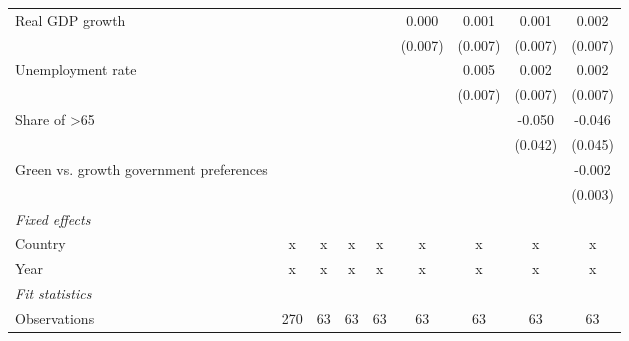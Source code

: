 \begin{table}[htbp]
\begin{tabular}{lcccccccc}
      Real GDP growth                                                                   &         &         &               &               & 0.000         & 0.001         & 0.001         & 0.002\\   
                                                                                        &         &         &               &               & (0.007)       & (0.007)       & (0.007)       & (0.007)\\   
      Unemployment rate                                                                 &         &         &               &               &               & 0.005         & 0.002         & 0.002\\   
                                                                                        &         &         &               &               &               & (0.007)       & (0.007)       & (0.007)\\   
      Share of >65                                                                      &         &         &               &               &               &               & -0.050        & -0.046\\   
                                                                                        &         &         &               &               &               &               & (0.042)       & (0.045)\\   
      Green vs. growth government preferences                                           &         &         &               &               &               &               &               & -0.002\\   
                                                                                        &         &         &               &               &               &               &               & (0.003)\\   
      \emph{Fixed effects}\\
      Country                                                                           & x       & x       & x             & x             & x             & x             & x             & x\\  
      Year                                                                              & x       & x       & x             & x             & x             & x             & x             & x\\  
      \midrule \emph{Fit statistics}\\
      Observations                                                                      & 270     & 63      & 63            & 63            & 63            & 63            & 63            & 63\\  

\end{tabular}
\end{table}
